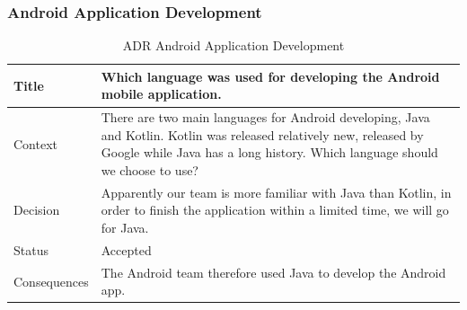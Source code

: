 \documentclass[12pt,a4paper]{article}
\begin{document}
\begin{appendices}
          \subsubsection{Android Application Development}
            \begin{table}[H]
              \centering
                \begin{tabularx}{\textwidth}{l X}
                  \hline
                  Title & Which language was used for developing the Android mobile application. \\ \hline
                  Context & There are two main languages for Android developing, Java and Kotlin. Kotlin was released relatively new, released by Google while Java has a long history. Which language should we choose to use?\\ 
                  Decision & Apparently our team is more familiar with Java than Kotlin, in order to finish the application within a limited time, we will go for Java.  \\ 
                  Status & Accepted \\ 
                  Consequences & The Android team therefore used Java to develop the Android app.  \\
                  \hline
                \end{tabularx}
                \caption[Table caption text]{ADR Android Application Development}
                \label{table:ADR Android Application Development}
            \end{table}


\end{appendices}
\end{document}
